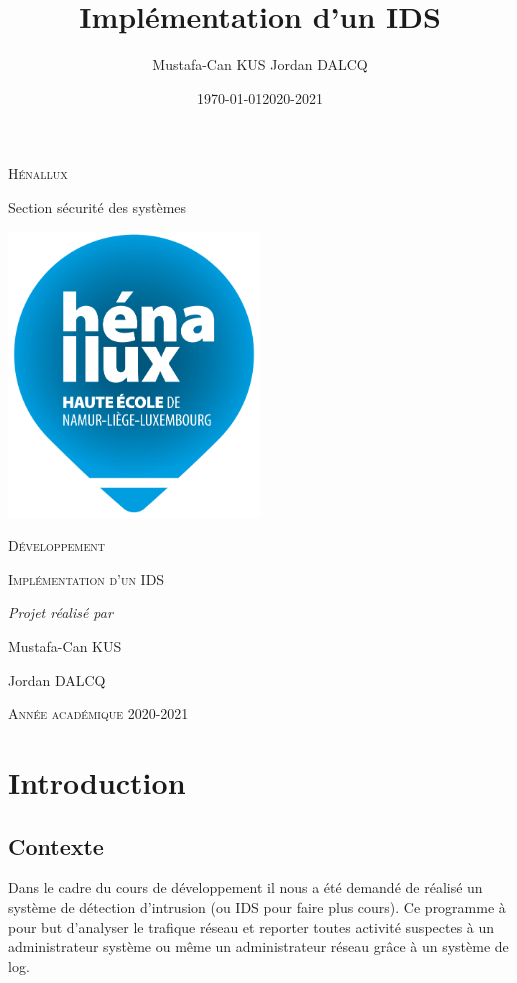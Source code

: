\documentclass[a4paper]{report}
\date{\today}
\title{}
\begin{document}
\tableofcontents

\begin{LaTex}
\begin{titlepage}
\centering
  {\scshape Hénallux\par\vspace{0.2cm} Section sécurité des systèmes\par \vspace{0.2cm}}
  \vspace{1cm}
  \includegraphics[width=0.5\textwidth]{img/school}\par\vspace{1cm}
  {\scshape \LARGE Développement \par}
  \vspace{0.2cm}
	{\scshape \Large Implémentation d'un IDS\par}
  \vspace{3cm}
  {\Large\itshape Projet réalisé par \par\vspace{0.5cm} Mustafa-Can KUS \par Jordan DALCQ \par}
  \vfill
  \scshape Année académique 2020-2021 
  \title{Implémentation d'un IDS}
  \author{Mustafa-Can KUS Jordan DALCQ}
  \date{2020-2021}
\end{titlepage}

\pagestyle{headings}
\end{LaTex}
\tableofcontents

\part{Introduction}
\label{sec:org5d1bc14}
\chapter{Contexte}
\label{sec:org3335258}
Dans le cadre du cours de développement il nous a été demandé de réalisé un système de détection d'intrusion (ou IDS pour faire plus cours).
Ce programme à pour but d'analyser le trafique réseau et reporter toutes activité suspectes à un administrateur système ou même un administrateur réseau
grâce à un système de log.
\end{document}
